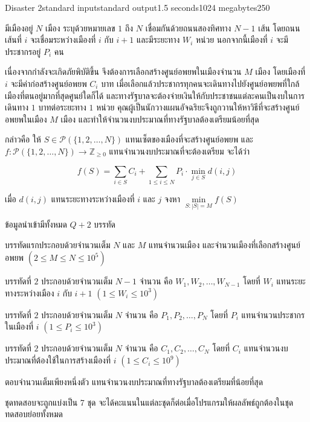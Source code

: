 \documentclass[11pt,a4paper]{article}
\begin{document}
\begin{problem}{Disaster 2}{standard input}{standard output}{1.5 seconds}{1024 megabytes}{250}

มีเมืองอยู่ $N$ เมือง ระบุด้วยหมายเลข $1$ ถึง $N$ เชื่อมกันด้วยถนนสองทิศทาง $N-1$ เส้น โดยถนนเส้นที่ $i$ จะเชื่อมระหว่างเมืองที่ $i$ กับ $i+1$ และมีระยะทาง $W_i$ หน่วย นอกจากนี้เมืองที่ $i$ จะมีประชากรอยู่ $P_i$ คน

เนื่องจากกำลังจะเกิดภัยพิบัติขึ้น จึงต้องการเลือกสร้างศูนย์อพยพในเมืองจำนวน $M$ เมือง โดยเมืองที่ $i$ จะมีค่าก่อสร้างศูนย์อพยพ $C_i$ บาท เมื่อเลือกแล้วประชากรทุกคนจะเดินทางไปยังศูนย์อพยพที่ใกล้เมืองที่ตนอยู่มากที่สุดศูนย์ใดก็ได้ และทางรัฐบาลจะต้องจ่ายเงินให้กับประชาชนแต่ละคนเป็นงบในการเดินทาง $1$ บาทต่อระยะทาง $1$ หน่วย คุณผู้เป็นนักวางแผนอัจฉริยะจึงถูกวานให้หาวิธีที่จะสร้างศูนย์อพยพในเมือง $M$ เมือง และทำให้จำนวนงบประมาณที่ทางรัฐบาลต้องเตรียมน้อยที่สุด

กล่าวคือ ให้ $S\in\mathcal{P}(\{1,2,\dots,N\})$ แทนเซ็ตของเมืองที่จะสร้างศูนย์อพยพ และ $f\colon\mathcal{P}(\{1,2,\dots,N\})\to\mathbb{Z}_{\ge 0}$ แทนจำนวนงบประมาณที่จะต้องเตรียม จะได้ว่า

$$f(S)=\sum\limits_{i\in S}C_i+\sum\limits_{1\leq i\leq N}P_i\cdot\min_{j\in S}d(i,j)$$

เมื่อ $d(i,j)$ แทนระยะทางระหว่างเมืองที่ $i$ และ $j$ จงหา $\min\limits_{S\colon |S|=M}f(S)$

\InputFile
ข้อมูลนำเข้ามีทั้งหมด $Q+2$ บรรทัด

บรรทัดแรกประกอบด้วยจำนวนเต็ม $N$ และ $M$ แทนจำนวนเมือง และจำนวนเมืองที่เลือกสร้างศูนย์อพยพ $(2\leq M\leq N\leq 10^5)$

บรรทัดที่ $2$ ประกอบด้วยจำนวนเต็ม $N-1$ จำนวน คือ $W_1,W_2,\ldots,W_{N-1}$ โดยที่ $W_i$ แทนระยะทางระหว่างเมือง $i$ กับ $i+1$ $(1\leq W_i\leq 10^3)$

บรรทัดที่ $2$ ประกอบด้วยจำนวนเต็ม $N$ จำนวน คือ $P_1,P_2,\ldots,P_N$ โดยที่ $P_i$ แทนจำนวนประชากรในเมืองที่ $i$ $(1\leq P_i\leq 10^3)$

บรรทัดที่ $2$ ประกอบด้วยจำนวนเต็ม $N$ จำนวน คือ $C_1,C_2,\ldots,C_N$ โดยที่ $C_i$ แทนจำนวนงบประมาณที่ต้องใช้ในการสร้างเมืองที่ $i$ $(1\leq C_i\leq 10^9)$

\OutputFile
ตอบจำนวนเต็มเพียงหนึ่งตัว แทนจำนวนงบประมาณที่ทางรัฐบาลต้องเตรียมที่น้อยที่สุด

\Scoring
ชุดทดสอบจะถูกแบ่งเป็น 7 ชุด จะได้คะแนนในแต่ละชุดก็ต่อเมื่อโปรแกรมให้ผลลัพธ์ถูกต้องในชุดทดสอบย่อยทั้งหมด

\begin{description}


\end{description}
\end{problem}
\end{document}
